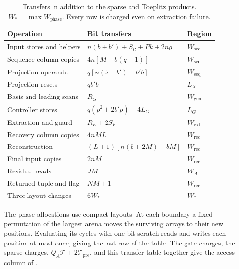 \documentclass[b5paper, 10pt, abstract=true, captions=tableheading]{scrartcl}
\theoremstyle{plain}
\theoremstyle{definition}
\begin{document}
\begin{table}[htbp]\centering\small
\caption{Transfers in addition to the sparse and Toeplitz products.
$W_*=\max W_{\mathrm{phase}}$. Every row is charged even on extraction failure.}
\label{tab:wopt-other-transfers}
\begin{tabular}{@{}p{.27\linewidth}p{.49\linewidth}l@{}}
\toprule Operation & Bit transfers & Region\\\midrule
Input stores and helpers & $n(b+b')+S_R+Pk+2ng$ & $W_{\mathrm{seq}}$\\
Sequence column copies & $4n[M+b(q-1)]$ & $W_{\mathrm{seq}}$\\
Projection operands & $q[n(b+b')+b' b]$ & $W_{\mathrm{seq}}$\\
Projection resets & $qb' b$ & $L_X$\\
Basis and leading scans & $R_G$ & $W_{\mathrm{gen}}$\\
Controller stores & $q(p^2+2b' p)+4L_G$ & $L_G$\\
Extraction and guard & $R_E+2S_F$ & $W_{\mathrm{ext}}$\\
Recovery column copies & $4nML$ & $W_{\mathrm{rec}}$\\
Reconstruction & $(L+1)[n(b+2M)+bM]$ & $W_{\mathrm{rec}}$\\
Final input copies & $2nM$ & $W_{\mathrm{rec}}$\\
Residual reads & $JM$ & $W_A$\\
Returned tuple and flag & $NM+1$ & $W_{\mathrm{rec}}$\\
Three layout changes & $6W_*$ & $W_*$\\\bottomrule
\end{tabular}
\end{table}

The phase allocations use compact layouts. At each boundary a fixed
permutation of the largest arena moves the surviving arrays to their new
positions. Evaluating its cycles with one-bit scratch reads and writes
each position at most once, giving the last row of the table.
The gate charges, the sparse charges, $Q_A\mathcal T+2\mathcal T_{\mathrm{pre}}$,
and this transfer table together give the access column of
.

\printbibliography[heading=bibintoc]
\end{document}
